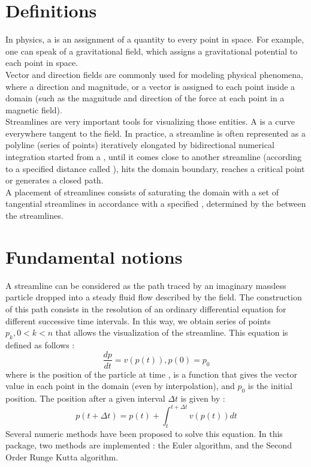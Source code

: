 \section{Definitions}
\label{Section_2D_Streamlines_Definitions}
In physics, a  is an assignment of a quantity to every point in
space. For example, one can speak of a gravitational field, which assigns a
gravitational potential to each point in space.\\
Vector and direction fields are commonly used for modeling physical phenomena,
where a direction and magnitude,
or a vector is assigned to each point inside a domain (such as the magnitude and
direction of the force at each point in a magnetic field).\\
Streamlines are very important tools for visualizing those entities. A
 is a curve everywhere tangent to the field. In practice, 
a streamline is often represented as a polyline (series of points) iteratively elongated by 
bidirectional numerical integration started from a , until 
it comes close to another streamline (according to a specified distance called 
), hits the domain boundary, reaches a 
critical point or generates a closed path.\\
A  placement of streamlines consists of saturating the domain with a set of tangential streamlines  in accordance with a specified , determined by the  between the streamlines.

\section{Fundamental notions}
\label{Section_2D_Streamlines_Fundamental_notions}
A streamline can be considered as the path traced by an imaginary massless particle dropped into a steady fluid flow described by the field. The construction of this path consists in the resolution of an ordinary differential equation for different successive time intervals. In this way, we obtain series of points $p_k, 0<k<n$ that allows the visualization of the streamline.
This equation is defined as follows : $$\frac{dp}{dt} = v(p(t)), p(0) = p_0$$ where  is the position of the particle at time ,  is a function that gives the vector value in each point in the domain (even by interpolation), and $p_0$ is the initial position.
The position after a given interval $\Delta t$ is given by : $$p(t + \Delta t) = p(t) + \int_t^{t+\Delta t} v(p(t)) dt$$
Several numeric methods have been proposed to solve this equation. In this package, two methods are implemented : the Euler algorithm, and the Second Order Runge Kutta algorithm.

